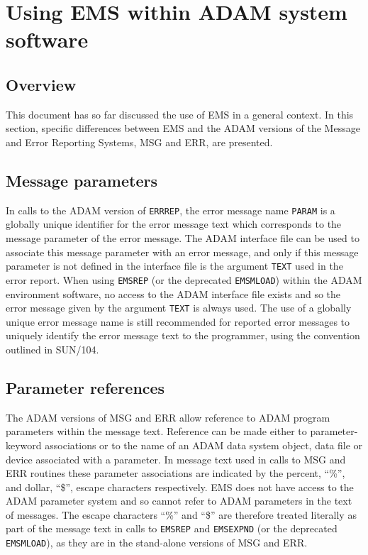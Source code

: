 \documentclass[twoside,11pt]{article}
\newcommand{\xref}[3]{#1}
\newcommand{\xlabel}[1]{}
\renewcommand{\_}{\texttt{\symbol{95}}}
\begin{document}
\newpage
\section{\xlabel{using_ems_within_adam_system_software}Using EMS within ADAM
system software} \label{ADAM_sect}
\subsection{\xlabel{ems_in_adam_overview}Overview}
This document has so far discussed the use of EMS in a general context. 
In this section, specific differences between EMS and the ADAM versions of
the Message and Error Reporting Systems, MSG and ERR, are presented.

\subsection{\xlabel{message_parameters}Message parameters}
In calls to the ADAM version of \texttt{ERR\_REP}, the error message name
\texttt{PARAM} is a 
globally unique identifier for the error message text which corresponds to
the message parameter of the error message.
The ADAM interface file can be used to associate this message parameter with
an error message, and only if this message parameter is not defined in the 
interface file is the argument \texttt{TEXT} used in the error report.
When using \texttt{EMS\_REP} (or the deprecated \texttt{EMS\_MLOAD}) within the
ADAM environment software, no access to the ADAM interface file exists and so
the error message given by the argument \texttt{TEXT} is always used.
The use of a globally unique error message name is still recommended for 
reported error messages to uniquely identify the error message text to the
programmer, using the convention outlined in 
\xref{SUN/104}{sun104}{reporting_errors}.

\subsection{\xlabel{parameter_references}Parameter references}
The ADAM versions of MSG and ERR allow reference to ADAM program
parameters within the message text. 
Reference can be made either to parameter-keyword associations or to the name
of an ADAM data system object, data file or device associated with a parameter.
In message text used in calls to MSG and ERR routines these parameter
associations are indicated by the percent, ``\%'', and dollar, ``\$'', escape
characters respectively.
EMS does not have access to the ADAM parameter system and so cannot refer
to ADAM parameters in the text of  messages.
The escape characters ``\%'' and ``\$'' are therefore treated literally as 
part of the message text in calls to \texttt{EMS\_REP} and \texttt{EMS\_EXPND}
(or the deprecated \texttt{EMS\_MLOAD}), as they are in the stand-alone
versions of MSG and ERR.
\end{document}
